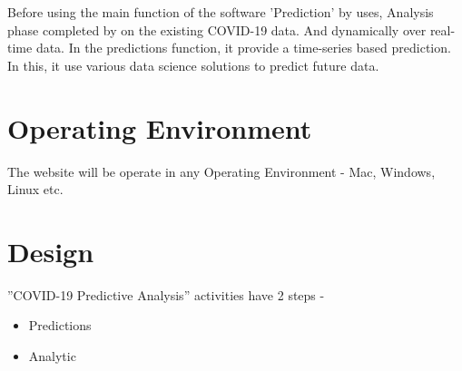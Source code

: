\documentclass{scrreprt}
\begin{document}
Before using the main function of the software 'Prediction' by uses, Analysis phase completed by on the existing COVID-19 data. And dynamically over real-time data. 
\newline
In the predictions function, it provide a time-series based prediction. In this, it use various data science solutions to predict future data.


\section{Operating Environment}
The website will be operate in any Operating Environment - Mac, Windows, Linux etc. 

\section{Design}
”COVID-19 Predictive Analysis” activities have 2 steps -
\begin{itemize}
    \item Predictions
    \item Analytic
\end{itemize}
\end{document}
